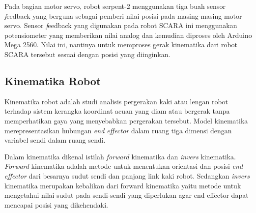  Pada bagian motor servo, robot serpent-2 menggunakan tiga buah sensor \emph feedback yang berguna sebagai pemberi nilai posisi pada masing-masing motor servo. Sensor \emph feedback yang digunakan pada robot SCARA ini menggunakan potensiometer yang memberikan nilai analog dan kemudian diproses oleh Arduino Mega 2560. Nilai ini, nantinya untuk memproses gerak kinematika dari robot SCARA tersebut sesuai dengan posisi yang diinginkan.
 \begin{table}[H]
 	\centering
 \caption{Spesifikasi Motor DC pada robot Serpent-2}
\end{table}


  \subsection{Kinematika Robot}
  Kinematika robot adalah studi analisis
  pergerakan kaki atau lengan robot terhadap
  sistem kerangka koordinat acuan yang diam
  atau bergerak tanpa memperhatikan gaya yang
  menyebabkan pergerakan tersebut. Model
  kinematika merepresentasikan hubungan \emph{end
  effector} dalam ruang tiga dimensi dengan
  variabel sendi dalam ruang sendi.
  
  Dalam kinematika dikenal istilah \emph{forward}
  kinematika dan \emph{invers} kinematika. \emph{Forward}
  kinematika adalah metode untuk menentukan
  orientasi dan posisi \emph{end effector} dari besarnya
  sudut sendi dan panjang link kaki robot.
  Sedangkan \emph{invers} kinematika merupakan
  kebalikan dari forward kinematika yaitu metode
  untuk mengetahui nilai sudut pada sendi-sendi
  yang diperlukan agar end effector dapat
  mencapai posisi yang dikehendaki. 
  
